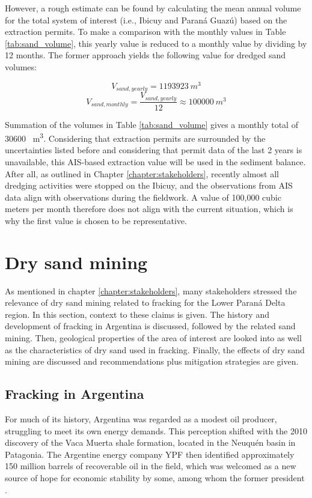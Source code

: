 However, a rough estimate can be found by calculating the mean annual volume for the total system of interest (i.e., Ibicuy and Paraná Guazú) based on the extraction permits. To make a comparison with the monthly values in Table \ref{tab:sand_volume}, this yearly value is reduced to a monthly value by dividing by 12 months. The former approach yields the following value for dredged sand volumes:

\begin{equation}
    V_{sand,yearly} = 1193923 ~m^3
\end{equation}
\begin{equation}
\label{eq:monthly extraction}
    V_{sand,monthly} = \frac{V_{sand,yearly}}{12} \approx 100000 ~m^3
\end{equation}

Summation of the volumes in Table \ref{tab:sand_volume} gives a monthly total of 30600 ~m\textsuperscript{3}. Considering that extraction permits are surrounded by the uncertainties listed before and considering that permit data of the last 2 years is unavailable, this AIS-based extraction value will be used in the sediment balance. After all, as outlined in Chapter \ref{chapter:stakeholders}, recently almost all dredging activities were stopped on the Ibicuy, and the observations from AIS data align with observations during the fieldwork. A value of 100,000 cubic meters per month therefore does not align with the current situation, which is why the first value is chosen to be representative.

\section{Dry sand mining}
As mentioned in chapter \ref{chapter:stakeholders}, many stakeholders stressed the relevance of dry sand mining related to fracking for the Lower Paraná Delta region. In this section, context to these claims is given. The history and development of fracking in Argentina is discussed, followed by the related sand mining. Then, geological properties of the area of interest are looked into as well as the characteristics of dry sand used in fracking. Finally, the effects of dry sand mining are discussed and recommendations plus mitigation strategies are given.

\subsection{Fracking in Argentina}
\label{sec: fracking in argentina}
For much of its history, Argentina was regarded as a modest oil producer, struggling to meet its own energy demands. This perception shifted with the 2010 discovery of the Vaca Muerta shale formation, located in the Neuquén basin in Patagonia. The Argentine energy company YPF then identified approximately 150 million barrels of recoverable oil in the field, which was welcomed as a new source of hope for economic stability by some, among whom the former president \autocite{kraussArgentinaHopesBig2011}.

